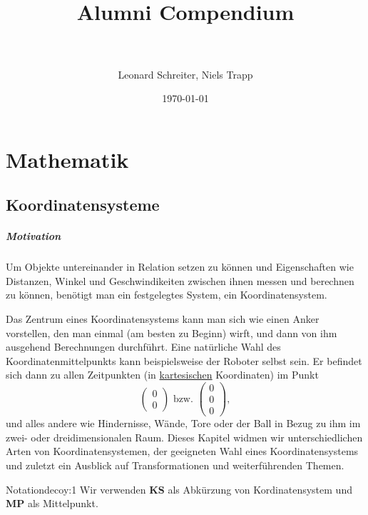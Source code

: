 \documentclass[12pt,a4paper]{report}
\title{\horrule{3pt} \\[0.4cm]%
	\textbf{Alumni Compendium}\\%
	\horrule{3pt} \\[0.5cm]}
\author{Leonard Schreiter, Niels Trapp}          %
\date{\today}           %
\begin{document}
	\maketitle
	\tableofcontents

	\chapter{Mathematik}
	 \section{Koordinatensysteme}
	  \paragraph{Motivation}

		  Um Objekte untereinander in Relation setzen zu können und Eigenschaften wie Distanzen, Winkel und Geschwindikeiten zwischen ihnen messen und berechnen zu können, benötigt man ein festgelegtes System, ein Koordinatensystem.

		  Das Zentrum eines Koordinatensystems kann man sich wie einen Anker vorstellen, den man einmal (am besten zu Beginn) wirft, und dann von ihm ausgehend Berechnungen durchführt.
		  Eine natürliche Wahl des Koordinatenmittelpunkts kann beispielsweise der Roboter selbst sein.
		  Er befindet sich dann zu allen Zeitpunkten (in \hyperref[Mathe_KS_kartesisch]{kartesischen} Koordinaten) im Punkt
		  \begin{equation*}
			  \begin{pmatrix}0\\0\end{pmatrix} \text{ bzw. }\begin{pmatrix}0\\0\\0\end{pmatrix},
		  \end{equation*}
		  und alles andere wie Hindernisse, Wände, Tore oder der Ball in Bezug zu ihm im zwei- oder dreidimensionalen Raum.
		  Dieses Kapitel widmen wir unterschiedlichen Arten von Koordinatensystemen, der geeigneten Wahl eines Koordinatensystems und zuletzt ein Ausblick auf Transformationen und weiterführenden Themen.

		  \begin{bemerkung}{Notation}{decoy:1}
			  Wir verwenden \textbf{KS} als Abkürzung von Kordinatensystem und \textbf{MP} als Mittelpunkt.
		  \end{bemerkung}
\end{document}
